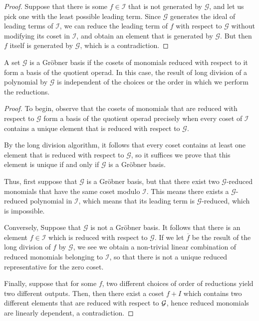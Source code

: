 \begin{proof}
Suppose that there is some $f\in \mathcal I$ that is not
generated by $\mathcal G$, and let us pick one with the least 
possible leading term. Since $\mathcal G$ generates the
ideal of leading terms of $\mathcal I$, we can reduce
the leading term of $f$ with respect to $\mathcal G$
without modifying its coset in $\mathcal I$,
and obtain an element that is generated by $\mathcal G$.
But then $f$ itself is generated by $\mathcal G$,
which is a contradiction.
\end{proof}


\begin{proposition}
A set $\mathcal G$ is a Gr\"obner basis if the cosets of monomials
reduced with respect to it form a basis of the quotient operad. 
In this case, the result of long division of a polynomial by
$\mathcal G$ is independent of the choices or the order in
 which we perform the reductions. 
\end{proposition}

\begin{proof}
To begin, observe that 
the cosets of monomials that are reduced with respect
to $\mathcal G$ form a basis of the quotient operad precisely
when every coset of $\mathcal I$ contains a unique element
that is reduced with respect to $\mathcal G$. 

By the long division algorithm, it follows that every coset
contains at least one element that is reduced with respect to $\mathcal G$,
so it suffices we prove that this element is unique if and only if
$\mathcal G$ is a Gr\"obner basis.

Thus, first suppose that $\mathcal G$ is a Gr\"obner basis, but that
there exist two $\mathcal G$-reduced monomials that have the same
coset modulo $\mathcal I$. This means there exists a $\mathcal G$-reduced 
polynomial in $\mathcal I$, which means that its leading term is
$\mathcal G$-reduced, which is impossible.

Conversely, Suppose that $\mathcal G$ is not a Gröbner basis. It follows
that there is an element $f\in\mathcal I$ which is reduced with respect to 
$\mathcal G$. If we let $\overline{f}$ be the result of the long division of
$f$ by $\mathcal G$, we see we obtain a non-trivial linear combination of reduced 
monomials belonging to $\mathcal I$, so that there is not a unique
reduced representative for the zero coset.

Finally, suppose that for some $f$, two different choices of order of reductions yield two different outputs. Then, then there exist a coset $f + I$ which contains two different elements that are reduced with respect to $\mathcal G$, hence reduced monomials are linearly dependent, a contradiction.
\end{proof}

